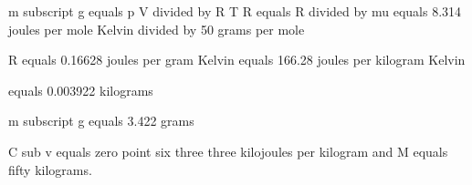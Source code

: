 m subscript g equals p V divided by R T  
R equals R divided by mu equals 8.314 joules per mole Kelvin divided by 50 grams per mole  

R equals 0.16628 joules per gram Kelvin equals 166.28 joules per kilogram Kelvin  

equals 0.003922 kilograms  

m subscript g equals 3.422 grams

C sub v equals zero point six three three kilojoules per kilogram and M equals fifty kilograms.